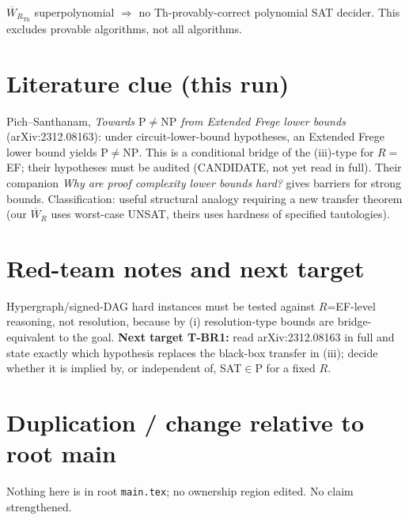 \documentclass{article}
\begin{document}
\begin{cor}
$\overline W_{R_{\mathrm{Th}}}$ superpolynomial $\Rightarrow$ no $\mathrm{Th}$-provably-correct polynomial SAT decider. This excludes provable algorithms, not all algorithms.
\end{cor}

\section*{Literature clue (this run)}
Pich--Santhanam, \emph{Towards $\mathrm P\ne\mathrm{NP}$ from Extended Frege lower bounds} (arXiv:2312.08163): under circuit-lower-bound hypotheses, an Extended Frege lower bound yields $\mathrm P\ne\mathrm{NP}$. This is a conditional bridge of the (iii)-type for $R=$EF; their hypotheses must be audited (CANDIDATE, not yet read in full). Their companion \emph{Why are proof complexity lower bounds hard?} gives barriers for strong bounds. Classification: useful structural analogy requiring a new transfer theorem (our $\overline W_R$ uses worst-case UNSAT, theirs uses hardness of specified tautologies).

\section*{Red-team notes and next target}
Hypergraph/signed-DAG hard instances must be tested against $R$=EF-level reasoning, not resolution, because by (i) resolution-type bounds are bridge-equivalent to the goal. \textbf{Next target T-BR1:} read arXiv:2312.08163 in full and state exactly which hypothesis replaces the black-box transfer in (iii); decide whether it is implied by, or independent of, SAT$\in$P for a fixed $R$.

\section*{Duplication / change relative to root main}
Nothing here is in root \texttt{main.tex}; no ownership region edited. No claim strengthened.
\end{document}
